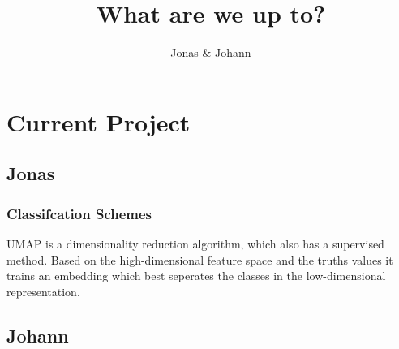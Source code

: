\documentclass{article}
\title{What are we up to?}
\author{Jonas \& Johann}
\begin{document}
\maketitle

\section{Current Project}
\subsection{Jonas}
\subsubsection{Classifcation Schemes}
UMAP is a dimensionality reduction algorithm, which also has a supervised method. Based on the high-dimensional feature space and the truths values it trains an embedding which best seperates the classes in the low-dimensional representation.




\subsection{Johann}
\end{document}
